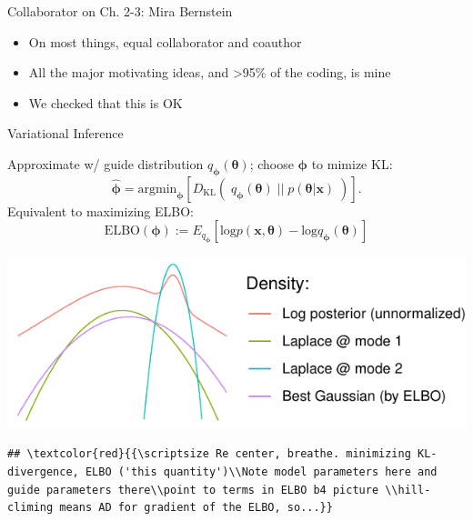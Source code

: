 \documentclass[
  ignorenonframetext,
]{beamer}
\providecommand{\tightlist}{%
  \setlength{\itemsep}{0pt}\setlength{\parskip}{0pt}}
\begin{document}
\begin{frame}{Collaborator on Ch. 2-3: Mira Bernstein}
\protect\hypertarget{collaborator-on-ch.-2-3-mira-bernstein}{}

\begin{itemize}
\tightlist
\item
  On most things, equal collaborator and coauthor
\item
  All the major motivating ideas, and \textgreater{}95\% of the coding,
  is mine
\item
  We checked that this is OK
\end{itemize}

\end{frame}

\begin{frame}[fragile]{Variational Inference}
\protect\hypertarget{variational-inference}{}

Approximate w/ guide distribution \(q_{\bm{\phi}}(\bm{\theta})\); choose
\(\bm{\phi}\) to mimize KL:
\[\hat{{\bm{\phi}}}=\mathrm{argmin}_{\bm{\phi}}\left[D_{\mathrm{KL}} \left(\;q_{\bm{\phi}}(\bm{\theta})\;\big|\big|\; p(\bm{\theta}|\bm{x})\;\right)\right].\]
Equivalent to maximizing ELBO:
\[\mathrm{ELBO}({\bm{\phi}}):=E_{q_{\bm{\phi}}}
\left[\mathrm{log} p(\bm{x},\bm{\theta})-\mathrm{log} q_{\bm{\phi}}(\bm{\theta})\right]\]

\includegraphics{defense_files/figure-beamer/unnamed-chunk-4-1.pdf}

\begin{verbatim}
## \textcolor{red}{{\scriptsize Re center, breathe. minimizing KL-divergence, ELBO ('this quantity')\\Note model parameters here and guide parameters there\\point to terms in ELBO b4 picture \\hill-climing means AD for gradient of the ELBO, so...}}
\end{verbatim}

\end{frame}
\end{document}
